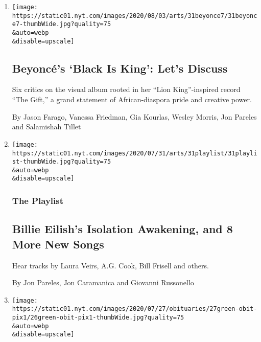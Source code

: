 \begin{enumerate}
\def\labelenumi{\arabic{enumi}.}
\item
  \href{/2020/07/31/arts/music/beyonce-black-is-king.html}{}

  \texttt{[image: https://static01.nyt.com/images/2020/08/03/arts/31beyonce7/31beyonce7-thumbWide.jpg?quality=75\\\&auto=webp\\\&disable=upscale]}

  \hypertarget{beyoncuxe9s-black-is-king-lets-discuss}{%
  \subsection{Beyoncé's `Black Is King': Let's
  Discuss}\label{beyoncuxe9s-black-is-king-lets-discuss}}

  Six critics on the visual album rooted in her ``Lion King''-inspired
  record ``The Gift,'' a grand statement of African-diaspora pride and
  creative power.

  By Jason Farago, Vanessa Friedman, Gia Kourlas, Wesley Morris, Jon
  Pareles and Salamishah Tillet
\item
  \href{/2020/07/31/arts/music/playlist-billie-eilish-snakehips-a-boogie.html}{}

  \texttt{[image: https://static01.nyt.com/images/2020/07/31/arts/31playlist/31playlist-thumbWide.jpg?quality=75\\\&auto=webp\\\&disable=upscale]}

  \hypertarget{the-playlist}{%
  \subsubsection{The Playlist}\label{the-playlist}}

  \hypertarget{billie-eilishs-isolation-awakening-and-8-more-new-songs}{%
  \subsection{Billie Eilish's Isolation Awakening, and 8 More New
  Songs}\label{billie-eilishs-isolation-awakening-and-8-more-new-songs}}

  Hear tracks by Laura Veirs, A.G. Cook, Bill Frisell and others.

  By Jon Pareles, Jon Caramanica and Giovanni Russonello
\item
  \href{/2020/07/26/arts/music/peter-green-dead.html}{}

  \texttt{[image: https://static01.nyt.com/images/2020/07/27/obituaries/27green-obit-pix1/26green-obit-pix1-thumbWide.jpg?quality=75\\\&auto=webp\\\&disable=upscale]}


\end{enumerate}

